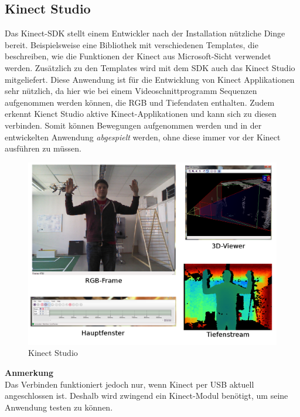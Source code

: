 \subsection{Kinect Studio}
Das Kinect-SDK stellt einem Entwickler nach der Installation nützliche Dinge bereit. Beispielsweise eine Bibliothek mit verschiedenen Templates, die beschreiben, wie die Funktionen der Kinect aus Microsoft-Sicht verwendet werden. Zusätzlich zu den Templates wird mit dem SDK auch das Kinect Studio mitgeliefert. Diese Anwendung ist für die Entwicklung von Kinect Applikationen sehr nützlich, da hier wie bei einem Videoschnittprogramm Sequenzen aufgenommen werden können, die RGB und Tiefendaten enthalten. Zudem erkennt Kienct Studio aktive Kinect-Applikationen und kann sich zu diesen verbinden. Somit können Bewegungen aufgenommen werden und in der entwickelten Anwendung \textit{abgespielt} werden, ohne diese immer vor der Kinect ausführen zu müssen.
\begin{figure}[H]						
	\centering							
	\includegraphics[scale=0.4]{Bilder/Kinect_Studio.png}			
	\caption{Kinect Studio}						
	\label{f:kinect_studio}						
\end{figure}
\noindent
\textbf{Anmerkung}\\
Das Verbinden funktioniert jedoch nur, wenn Kinect per USB aktuell angeschlossen ist. Deshalb wird zwingend ein Kinect-Modul benötigt, um seine Anwendung testen zu können.